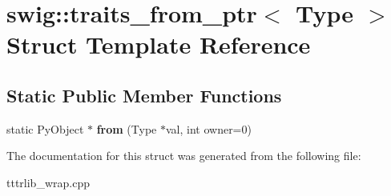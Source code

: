 \hypertarget{structswig_1_1traits__from__ptr}{}\section{swig\+:\+:traits\+\_\+from\+\_\+ptr$<$ Type $>$ Struct Template Reference}
\label{structswig_1_1traits__from__ptr}
\subsection*{Static Public Member Functions}
\begin{DoxyCompactItemize}
\item 
\mbox{\label{structswig_1_1traits__from__ptr_a02f758f7fd32a799a85cf3509940ff02}} 
static Py\+Object $\ast$ {\bfseries from} (Type $\ast$val, int owner=0)
\end{DoxyCompactItemize}


The documentation for this struct was generated from the following file\+:\begin{DoxyCompactItemize}
\item 
tttrlib\+\_\+wrap.\+cpp\end{DoxyCompactItemize}
